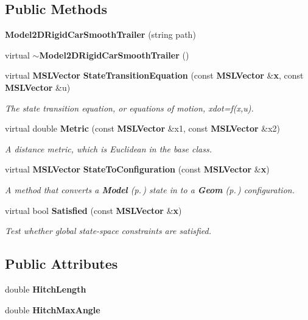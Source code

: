 \subsection*{Public Methods}
\begin{CompactItemize}
\item 
{\bf Model2DRigid\-Car\-Smooth\-Trailer} (string path)
\item 
virtual {\bf $\sim$Model2DRigid\-Car\-Smooth\-Trailer} ()
\item 
virtual {\bf MSLVector} {\bf State\-Transition\-Equation} (const {\bf MSLVector} \&{\bf x}, const {\bf MSLVector} \&u)
\begin{CompactList}\small\item\em The state transition equation, or equations of motion, xdot=f(x,u).\item\end{CompactList}\item 
virtual double {\bf Metric} (const {\bf MSLVector} \&x1, const {\bf MSLVector} \&x2)
\begin{CompactList}\small\item\em A distance metric, which is Euclidean in the base class.\item\end{CompactList}\item 
virtual {\bf MSLVector} {\bf State\-To\-Configuration} (const {\bf MSLVector} \&{\bf x})
\begin{CompactList}\small\item\em A method that converts a {\bf Model} {\rm (p.\,\pageref{classModel})} state in to a {\bf Geom} {\rm (p.\,\pageref{classGeom})} configuration.\item\end{CompactList}\item 
virtual bool {\bf Satisfied} (const {\bf MSLVector} \&{\bf x})
\begin{CompactList}\small\item\em Test whether global state-space constraints are satisfied.\item\end{CompactList}\end{CompactItemize}
\subsection*{Public Attributes}
\begin{CompactItemize}
\item 
double {\bf Hitch\-Length}
\item 
double {\bf Hitch\-Max\-Angle}
\end{CompactItemize}


